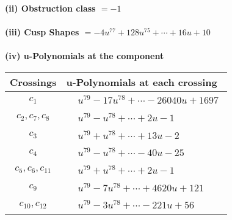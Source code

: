 \documentclass[1p]{elsarticle_modified}
\theoremstyle{definition}
\begin{document}
\flushleft \textbf{(ii) Obstruction class $= -1$}\\~\\
\flushleft \textbf{(iii) Cusp Shapes $= -4 u^{77}+128 u^{75}+\cdots+16 u+10$}\\~\\
\newpage\renewcommand{\arraystretch}{1}
\flushleft \textbf{(iv) u-Polynomials at the component}\newline \\
\begin{tabular}{m{50pt}|m{274pt}}
Crossings & \hspace{64pt}u-Polynomials at each crossing \\
\hline $$\begin{aligned}c_{1}\end{aligned}$$&$\begin{aligned}
&u^{79}-17 u^{78}+\cdots-26040 u+1697
\end{aligned}$\\
\hline $$\begin{aligned}c_{2},c_{7},c_{8}\end{aligned}$$&$\begin{aligned}
&u^{79}- u^{78}+\cdots+2 u-1
\end{aligned}$\\
\hline $$\begin{aligned}c_{3}\end{aligned}$$&$\begin{aligned}
&u^{79}+u^{78}+\cdots+13 u-2
\end{aligned}$\\
\hline $$\begin{aligned}c_{4}\end{aligned}$$&$\begin{aligned}
&u^{79}- u^{78}+\cdots-40 u-25
\end{aligned}$\\
\hline $$\begin{aligned}c_{5},c_{6},c_{11}\end{aligned}$$&$\begin{aligned}
&u^{79}+u^{78}+\cdots+2 u-1
\end{aligned}$\\
\hline $$\begin{aligned}c_{9}\end{aligned}$$&$\begin{aligned}
&u^{79}-7 u^{78}+\cdots+4620 u+121
\end{aligned}$\\
\hline $$\begin{aligned}c_{10},c_{12}\end{aligned}$$&$\begin{aligned}
&u^{79}-3 u^{78}+\cdots-221 u+56
\end{aligned}$\\
\hline
\end{tabular}\\~\\
\end{document}
